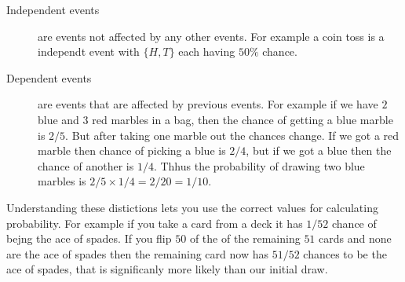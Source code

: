 \begin{description}
\item [Independent events] are events not affected by any other events. For example a coin toss is a independt event with $\{H,T\}$ each having $50\%$ chance.
\item [Dependent events] are events that are affected by previous events. For example if we have $2$ blue and $3$ red marbles in a bag, then the chance of getting a blue marble is $2/5$. But after taking one marble out the chances change. If we got a red marble then chance of picking a blue is $2/4$, but if we got a blue then the chance of another is $1/4$. Thhus the probability of drawing two blue marbles is $2/5 \times 1/4 = 2/20 = 1/10$.
\end{description} 

Understanding these distictions lets you use the correct values for calculating probability. For example if you take a card from a deck it has $1/52$ chance of bejng the ace of spades. If you flip $50$ of the of the remaining $51$ cards and none are the ace of spades then the remaining card now has $51/52$ chances to be the ace of spades, that is significanly more likely than our initial draw.

